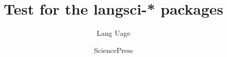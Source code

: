 \documentclass[output=book
  ,nonflat
  ,modfonts,
  ,colorlinks
  ,undecapitalize 
  ,collection
  ,showindex
  ,draftmode
  ,openreview
  ,nobabel
  ,booklanguage=french
  ,oldstylenumbers
  ]{langsci/langscibook}
\title{Test for the langsci-* packages}
\author{Lang Uage\and Science\lastand Press}
\begin{document}
\renewcommand{\lsImpressumExtra}{Manuscript submitted in fulfillment of entering the Galactical Hall of Fame.}
\maketitle 
\tableofcontents
\mainmatter


 

 
 
\end{document}
